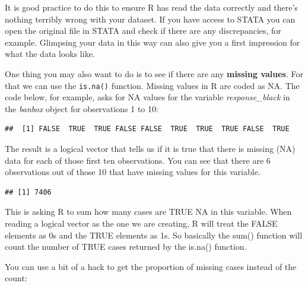 \documentclass[]{book}
\newenvironment{Shaded}{\begin{snugshade}}{\end{snugshade}}
\newcommand{\DecValTok}[1]{\textcolor[rgb]{0.00,0.00,0.81}{#1}}
\newcommand{\KeywordTok}[1]{\textcolor[rgb]{0.13,0.29,0.53}{\textbf{#1}}}
\newcommand{\NormalTok}[1]{#1}
\newcommand{\OperatorTok}[1]{\textcolor[rgb]{0.81,0.36,0.00}{\textbf{#1}}}
\theoremstyle{definition}
\theoremstyle{definition}
\theoremstyle{definition}
\theoremstyle{remark}
\begin{document}
It is good practice to do this to ensure R has read the data correctly
and there's nothing terribly wrong with your dataset. If you have access
to STATA you can open the original file in STATA and check if there are
any discrepancies, for example. Glimpsing your data in this way can also
give you a first impression for what the data looks like.

One thing you may also want to do is to see if there are any
\textbf{missing values}. For that we can use the \texttt{is.na()}
function. Missing values in R are coded as NA. The code below, for
example, asks for NA values for the variable \emph{response\_black} in
the \emph{banbox} object for observations 1 to 10:

\begin{Shaded}
\end{Shaded}

\begin{verbatim}
##  [1] FALSE  TRUE  TRUE FALSE FALSE  TRUE  TRUE  TRUE FALSE  TRUE
\end{verbatim}

The result is a logical vector that tells us if it is true that there is
missing (NA) data for each of those first ten observations. You can see
that there are 6 observations out of those 10 that have missing values
for this variable.

\begin{Shaded}
\end{Shaded}

\begin{verbatim}
## [1] 7406
\end{verbatim}

This is asking R to sum how many cases are TRUE NA in this variable.
When reading a logical vector as the one we are creating, R will treat
the FALSE elements as 0s and the TRUE elements as 1s. So basically the
sum() function will count the number of TRUE cases returned by the
is.na() function.

You can use a bit of a hack to get the proportion of missing cases
instead of the count:
\end{document}
